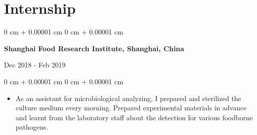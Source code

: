 \documentclass[10pt, letterpaper]{article}
\newenvironment{highlights}{
    \begin{itemize}[
        topsep=0.10 cm,
        parsep=0.10 cm,
        partopsep=0pt,
        itemsep=0pt,
        leftmargin=0 cm + 10pt
    ]
}{
    \end{itemize}
} %
\newenvironment{onecolentry}{
    \begin{adjustwidth}{
        0 cm + 0.00001 cm
    }{
        0 cm + 0.00001 cm
    }
}{
    \end{adjustwidth}
} %
\newenvironment{twocolentry}[2][]{
    \onecolentry
    \def\secondColumn{#2}
    \setcolumnwidth{\fill, 4.5 cm}
    \begin{paracol}{2}
}{
    \switchcolumn \raggedleft \secondColumn
    \end{paracol}
    \endonecolentry
} %
\newenvironment{header}{
    \setlength{\topsep}{0pt}\par\kern\topsep\centering\linespread{1}
}{
    \par\kern\topsep
} %
\begin{document}
\begin{header}
\begin{comment}
         

        \vspace{0.2 cm}

          \begin{twocolentry}
        {May 2016  }
            \textbf{\textbf{\textbf{Marine Cultural Creativity Competition | Team work }}
 }

        \end{twocolentry}
       
   
        \vspace{0.10 cm}
       

        \begin{onecolentry}
            \begin{highlights}
                \item Designed a creative artwork on marine culture and draw the design with Photoshop
               
            
            \end{highlights}
        \end{onecolentry}
 
         

        \vspace{0.2 cm}
      



\end{comment}

\section{  Internship}
  



    \begin{twocolentry}
        {Dec 2018 - Feb 2019 }\textbf{Shanghai Food Research Institute, Shanghai, China  }

    \end{twocolentry}

  \vspace{0.10 cm}
       

        \begin{onecolentry}
            \begin{highlights}
                \item 
As an assistant for microbiological analyzing, I prepared and sterilized the culture medium every morning. Prepared experimental materials in advance and learnt from the laboratory staff about the detection for various foodborne pathogens. 
               

\end{highlights}
\end{onecolentry}
\end{header}
\end{document}
